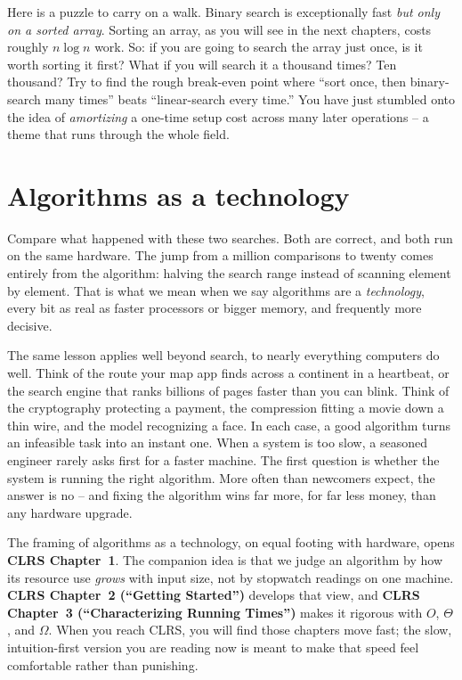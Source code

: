 \begin{walkbox}
Here is a puzzle to carry on a walk. Binary search is exceptionally fast \emph{but only
on a sorted array}. Sorting an array, as you will see in the next chapters, costs
roughly $n\log n$ work. So: if you are going to search the array just once, is it
worth sorting it first? What if you will search it a thousand times? Ten thousand?
Try to find the rough break-even point where ``sort once, then binary-search many
times'' beats ``linear-search every time.'' You have just stumbled onto the idea of
\emph{amortizing} a one-time setup cost across many later operations -- a theme that
runs through the whole field.
\end{walkbox}

\section{Algorithms as a technology}

Compare what happened with these two searches. Both are correct, and both run
on the same hardware. The jump from a million comparisons to twenty comes entirely
from the algorithm: halving the search range instead of scanning element by element.
That is what we mean when we say algorithms
are a \emph{technology}, every bit as real as faster processors or bigger memory, and
frequently more decisive.

\begin{aestheticbox}
The same lesson applies well beyond search, to nearly everything computers do
well. Think of the route your map app finds across a continent in a heartbeat,
or the search engine that ranks billions of pages faster than you can blink.
Think of the cryptography protecting a payment, the compression fitting a movie
down a thin wire, and the model recognizing a face. In each case, a good
algorithm turns an infeasible task into an instant one. When a system is too
slow, a seasoned engineer rarely asks first for a faster machine. The first
question is whether the system is running the right algorithm. More often than
newcomers expect, the answer is no -- and fixing the algorithm wins far more,
for far less money, than any hardware upgrade.
\end{aestheticbox}

\begin{connectionbox}
The framing of algorithms as a technology, on equal footing with hardware, opens
\textbf{CLRS Chapter~1}. The companion idea is that we judge an algorithm by how
its resource use \emph{grows} with input size, not by stopwatch readings on one
machine. \textbf{CLRS Chapter~2 (``Getting Started'')} develops that view, and
\textbf{CLRS Chapter~3 (``Characterizing Running Times'')} makes it rigorous
with $O$, $\Theta$, and $\Omega$. When you reach CLRS, you will find those
chapters move fast; the slow, intuition-first version you are reading now is meant to
make that speed feel comfortable rather than punishing.
\end{connectionbox}

